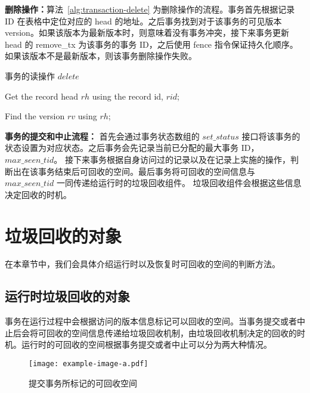 \textbf{删除操作：}算法~\ref{alg:transaction-delete} 为删除操作的流程。事务首先根据记录 ID 在表格中定位对应的 head 的地址。之后事务找到对于该事务的可见版本 version。如果该版本为最新版本时，则意味着没有事务冲突，接下来事务更新 head 的 remove\_tx 为该事务的事务 ID，之后使用 fence 指令保证持久化顺序。如果该版本不是最新版本，则该事务删除操作失败。

\begin{algorithm}[h]
    \caption{事务的读操作 $delete$}
    \label{alg:transaction-delete}
    \BlankLine
    Get the record head $rh$ using the record id, $rid$;

    Find the version $rv$ using $rh$;


\end{algorithm}

\textbf{事务的提交和中止流程：} 首先会通过事务状态数组的 $set\_status$ 接口将该事务的状态设置为对应状态。之后事务会先记录当前已分配的最大事务 ID，$max\_seen\_tid$。
接下来事务根据自身访问过的记录以及在记录上实施的操作，判断出在该事务结束后可回收的空间。最后事务将可回收的空间信息与 $max\_seen\_tid$ 一同传递给运行时的垃圾回收组件。
垃圾回收组件会根据这些信息决定回收的时机。


\section{垃圾回收的对象}
\label{sec:space}

在本章节中，我们会具体介绍运行时以及恢复时可回收的空间的判断方法。

\subsection{运行时垃圾回收的对象}

事务在运行过程中会根据访问的版本信息标记可以回收的空间。当事务提交或者中止后会将可回收的空间信息传递给垃圾回收机制，由垃圾回收机制决定的回收的时机。运行时的可回收的空间根据事务提交或者中止可以分为两大种情况。

\begin{figure}
    \centering
    \texttt{[image: example-image-a.pdf]}
    \caption{提交事务所标记的可回收空间}
    \label{fig:space-commit}
\end{figure}

